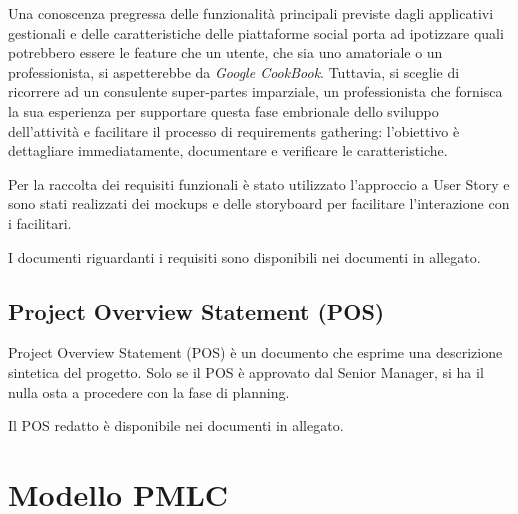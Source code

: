 Una conoscenza pregressa delle funzionalità principali previste dagli applicativi gestionali e delle caratteristiche delle 
piattaforme social porta ad ipotizzare quali potrebbero essere le feature che un utente, che sia uno amatoriale o un 
professionista, si aspetterebbe da \textit{Google CookBook}.
Tuttavia, si sceglie di ricorrere ad un consulente super-partes imparziale, un professionista che fornisca la sua esperienza 
per supportare questa fase embrionale dello sviluppo dell'attività e facilitare il processo di requirements gathering: 
l'obiettivo è dettagliare immediatamente, documentare e verificare le caratteristiche.

Per la raccolta dei requisiti funzionali è stato utilizzato l'approccio a User Story e sono stati realizzati dei mockups e 
delle storyboard per facilitare l'interazione con i facilitari.

I documenti riguardanti i requisiti sono disponibili nei documenti in allegato.

\subsection{Project Overview Statement (POS)}

Project Overview Statement (POS) è un documento che esprime una descrizione sintetica del progetto.
Solo se il POS è approvato dal Senior Manager, si ha il nulla osta a procedere con la fase di planning.

Il POS redatto è disponibile nei documenti in allegato.


\section{Modello PMLC}
